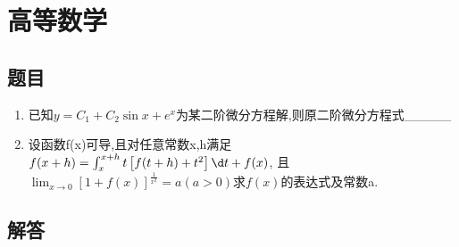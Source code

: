\documentclass[12pt, a4paper, oneside, UTF8]{ctexbook}
\begin{document}
% 
\else
\fi
\chapter{高等数学}

\section{题目}
\begin{enumerate}
    \item \bt 已知$y=C_1+C_2 \sin{x} + e^x$为某二阶微分方程解,则原二阶微分方程式\_\_\_\_\_ 

    \item \bl 设函数f(x)可导,且对任意常数x,h满足$f(x+h)=\int_{x}^{x+h}t\left[f(t+h)+t^2\right]\d t + f(x)$, 
    且$\lim_{x\to 0}\left[1+f(x)\right]^{\frac{1}{x^2}}=a(a>0)$求$f(x)$的表达式及常数a. 
\end{enumerate}


\section{解答}
\end{document}
